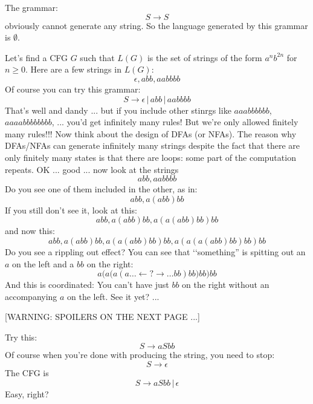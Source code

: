 \begin{eg}
The grammar:
\[
S \rightarrow S
\]
obviously cannot generate any string. So the language generated by this 
grammar is $\emptyset$.
\end{eg}



\vspace{2in}






\vspace{2in}



\vspace{2in}



\vspace{2in}


\vspace{2in}

\newpage
\begin{eg}
Let's find a CFG $G$ such that $L(G)$ is the set of strings of the form
$a^n b^{2n}$ for $n \geq 0$.
Here are a few strings in $L(G)$:
\[
\epsilon, abb, aabbbb
\]
Of course you can try this grammar:
\[
S \rightarrow \epsilon \,|\, abb \,|\, aabbbb
\]
That's well and dandy ... but if you include other stinrgs like
$aaabbbbbb$, $aaaabbbbbbbb$, ... you'd get infinitely many rules!
But we're only allowed finitely many rules!!!
Now think about the design of DFAs (or NFAs).
The reason why DFAs/NFAs can generate infinitely many strings despite
the fact that there are only finitely many states is that there are loops:
some part of the computation repeats.
OK ... good ... now look at the strings
\[
abb, aabbbb
\]
Do you see one of them included in the other, as in:
\[
abb, a(abb)bb
\]
If you still don't see it, look at this:
\[
abb, a(abb)bb, a(a(abb)bb)bb
\]
and now this:
\[
abb, a(abb)bb, a(a(abb)bb)bb, a(a(a(abb)bb)bb)bb
\]
Do you see a rippling out effect?
You can see that \lq\lq something'' is spitting out an $a$ on the left
and a $bb$ on the right:
\[
a \biggl( a \bigl( a (a\ldots \leftarrow ? \rightarrow \ldots
bb )
bb \bigr)
bb \biggr)
bb
\]
And this is coordinated: You can't have just $bb$ on the right without
an accompanying $a$ on the left. See it yet? ...

[WARNING: SPOILERS ON THE NEXT PAGE ...]

\newpage
Try this:
\[
S \rightarrow a S bb
\]
Of course when you're done with producing the string, you need to stop:
\[
S \rightarrow \epsilon
\]
The CFG is
\[
S \rightarrow a S bb \,|\, \epsilon
\]
Easy, right?
\end{eg}


